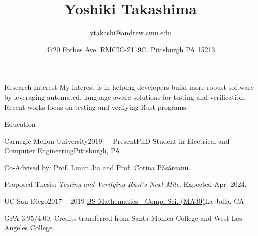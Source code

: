 \documentclass{resume} %
\title{\bf Yoshiki Takashima}
\author{\href{ytakashi@andrew.cmu.edu}{ytakashi@andrew.cmu.edu}}
\date{4720 Forbes Ave, RMCIC-2119C. Pittsburgh PA 15213}
\begin{document}
\maketitle

\begin{rSection}{Research Interest}
  My interest is in helping developers build more robust software by
  leveraging automated, language-aware solutions for testing and
  verification. Recent works focus on testing and verifying Rust
  programs.
\end{rSection}

\begin{rSection}{Education}
  \begin{rSubsection}{Carnegie Mellon University}{$2019 -$
      Present}{PhD Student in Electrical and Computer
      Engineering}{Pittsburgh, PA}
  \item Co-Advised by: Prof. Limin Jia and Prof. Corina P\u{a}s\u{a}reanu.
  \item Proposed Thesis: \textit{Testing and Verifying Rust's Next Mile}. Expected Apr. 2024.
  \end{rSubsection}

  \begin{rSubsection}{UC San Diego}{$2017 -
      2019$}{
      \href{https://catalog.ucsd.edu/curric/MATH-ug.html}
      {BS Mathematics - Comp. Sci. (MA30)}}{La Jolla, CA}
  \item GPA $3.95/4.00$. Credits transferred from Santa Monica College
    and West Los Angeles College.
  \end{rSubsection}


\end{rSection}
\end{document}
